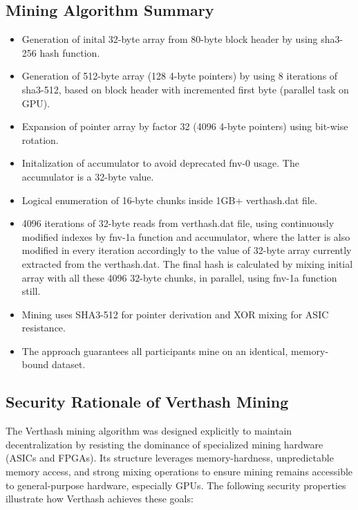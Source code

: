 \documentclass[12pt]{article}
\begin{document}
\subsection{Mining Algorithm Summary}

\begin{itemize}
    \item Generation of inital 32-byte array from 80-byte block header by using sha3-256 hash function.
    \item Generation of 512-byte array (128 4-byte pointers) by using 8 iterations of sha3-512, based on block header with incremented first byte (parallel task on GPU).
    \item Expansion of pointer array by factor 32 (4096 4-byte pointers) using bit-wise rotation.
    \item Initalization of accumulator to avoid deprecated fnv-0 usage. The accumulator is a 32-byte value.
    \item Logical enumeration of 16-byte chunks inside 1GB+ verthash.dat file.
    \item 4096 iterations of 32-byte reads from verthash.dat file, using continuously modified indexes by fnv-1a function and accumulator, where the latter is also modified in every iteration accordingly to the value of 32-byte array currently extracted from the verthash.dat. The final hash is calculated by mixing initial array with all these 4096 32-byte chunks, in parallel, using fnv-1a function still.
    \item Mining uses SHA3-512 for pointer derivation and XOR mixing for ASIC resistance.
    \item The approach guarantees all participants mine on an identical, memory-bound dataset.
\end{itemize}

\subsection{Security Rationale of Verthash Mining}

The Verthash mining algorithm was designed explicitly to maintain decentralization by resisting the dominance of specialized mining hardware (ASICs and FPGAs). Its structure leverages memory-hardness, unpredictable memory access, and strong mixing operations to ensure mining remains accessible to general-purpose hardware, especially GPUs. The following security properties illustrate how Verthash achieves these goals:
\end{document}
